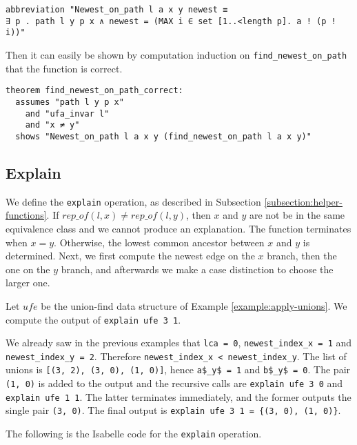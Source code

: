 \begin{lstlisting}
abbreviation "Newest_on_path l a x y newest ≡
∃ p . path l y p x ∧ newest = (MAX i ∈ set [1..<length p]. a ! (p ! i))"
\end{lstlisting}

Then it can easily be shown by computation induction on \lstinline{find_newest_on_path} that the function is correct.

\begin{lstlisting}
theorem find_newest_on_path_correct:
  assumes "path l y p x"
    and "ufa_invar l"
    and "x ≠ y"
  shows "Newest_on_path l a x y (find_newest_on_path l a x y)"
\end{lstlisting}

\subsection{Explain}

We define the \lstinline|explain| operation, as described in Subsection \ref{subsection:helper-functions}.
If $rep\_of(l, x) \neq rep\_of(l, y)$, then $x$ and $y$ are not be in the same equivalence class and we cannot produce an explanation.
The function terminates when $x = y$.
Otherwise, the lowest common ancestor between $x$ and $y$ is determined.
Next, we first compute the newest edge on the $x$ branch, then the one on the $y$ branch, and afterwards we make a case distinction to choose the larger one.

\begin{exmp}
Let $ufe$ be the union-find data structure of Example \ref{example:apply-unions}. We compute the output of \lstinline|explain ufe 3 1|.

We already saw in the previous examples that \lstinline|lca = 0|, \lstinline|newest_index_x = 1| and \lstinline|newest_index_y = 2|.
Therefore \lstinline|newest_index_x < newest_index_y|.
The list of unions is \lstinline|[(3, 2), (3, 0), (1, 0)]|, hence \lstinline|a$_y$ = 1| and \lstinline|b$_y$ = 0|. The pair \lstinline|(1, 0)| is added to the output and the recursive calls are \lstinline|explain ufe 3 0| and \lstinline|explain ufe 1 1|. The latter terminates immediately, and the former outputs the single pair \lstinline|(3, 0)|. The final output is \lstinline|explain ufe 3 1 = {(3, 0), (1, 0)}|.
\end{exmp}

The following is the Isabelle code for the \lstinline|explain| operation.

